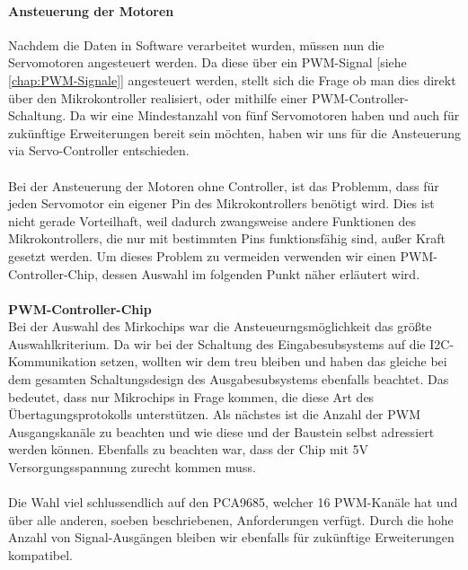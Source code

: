\documentclass[titlepage,12pt,twoside]{article}
\begin{document}
\paragraph{Ansteuerung der Motoren}
\label{par:Ansteuerung der Motoren}
\hfill \break
\hfill \break
Nachdem die Daten in Software verarbeitet wurden, müssen nun die Servomotoren angesteuert werden. Da diese über ein PWM-Signal [siehe \textcolor{blue}{\autoref{chap:PWM-Signale}}]
angesteuert werden, stellt sich die Frage ob man dies direkt über den Mikrokontroller realisiert, oder mithilfe einer PWM-Controller-Schaltung.
Da wir eine Mindestanzahl von fünf Servomotoren haben und auch für zukünftige Erweiterungen bereit sein möchten, haben wir uns für die Ansteuerung
via Servo-Controller entschieden. \\
\\
Bei der Ansteuerung der Motoren ohne Controller, ist das Problemm, dass für jeden Servomotor ein eigener Pin des Mikrokontrollers benötigt wird.
Dies ist nicht gerade Vorteilhaft, weil dadurch zwangsweise andere Funktionen des Mikrokontrollers, die nur mit bestimmten Pins funktionsfähig sind,
außer Kraft gesetzt werden. Um dieses Problem zu vermeiden verwenden wir einen PWM-Controller-Chip, dessen Auswahl im folgenden Punkt näher erläutert wird. \\
\\
\textbf{PWM-Controller-Chip}
\\
Bei der Auswahl des Mirkochips war die Ansteueurngsmöglichkeit das größte Auswahlkriterium. Da wir bei der Schaltung des Eingabesubsystems
auf die I2C-Kommunikation setzen, wollten wir dem treu bleiben und haben das gleiche bei dem gesamten Schaltungsdesign des Ausgabesubsystems
ebenfalls beachtet. Das bedeutet, dass nur Mikrochips in Frage kommen, die diese Art des Übertagungsprotokolls unterstützen. Als nächstes
ist die Anzahl der PWM Ausgangskanäle zu beachten und wie diese und der Baustein selbst adressiert werden können. Ebenfalls zu beachten war,
dass der Chip mit 5V Versorgungsspannung zurecht kommen muss. \\
\\
Die Wahl viel schlussendlich auf den PCA9685, welcher 16 PWM-Kanäle hat und über alle anderen, soeben beschriebenen, Anforderungen verfügt.
Durch die hohe Anzahl von Signal-Ausgängen bleiben wir ebenfalls für zukünftige Erweiterungen kompatibel. \\
\\
\end{document}
